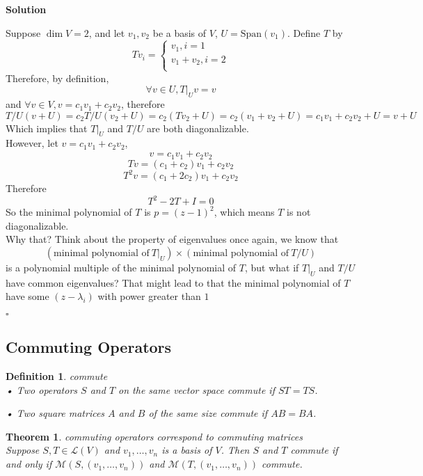 \documentclass{article}
\newtheorem{theorem}{Theorem}[subsection]
\newtheorem{definition}{Definition}[subsection]
\newenvironment{solution}{%
{
    \textbf{Solution\\}
    }
}{
  \hfill $\square$ 
  \par\bigskip 
}
\newcommand{\spans}{\text{Span}}
\begin{document}
\begin{CJK}{UTF8}{gkai}
\begin{solution}
    Suppose $\dim V = 2$, and let $v_1,v_2$ be a basis of $V$, $U = \spans(v_1)$. Define $T$ by 
    \[Tv_i = \begin{cases}
        v_1,i = 1\\
        v_1 + v_2, i = 2\\
    \end{cases}\]
    Therefore, by definition,
    \[\forall v \in U, T|_U v = v \]
    and $\forall v \in V, v = c_1 v_1 + c_2 v_2$, therefore 
    \[T/U (v + U) = c_2 T/U (v_2 + U) = c_2 (Tv_2 + U) = c_2 (v_1 + v_2 + U) = c_1 v_1 + c_2 v_2 + U = v + U\]
    Which implies that $T|_U$ and $T/U$ are both diagonalizable.\\

    However, let $v = c_1 v_1 + c_2 v_2$,
    \[v = c_1 v_1 + c_2 v_2\]
    \[Tv = (c_1 + c_2) v_1 + c_2 v_2\]
    \[T^2 v = (c_1 + 2c_2) v_1 + c_2 v_2\]
    Therefore
    \[T^2 - 2T + I = 0\]
    So the minimal polynomial of $T$ is $p = (z - 1)^2$, which means $T$ is not diagonalizable.\\

    Why that? Think about the property of eigenvalues once again, we know that
    \[(\text{minimal polynomial of}~ T|_U) \times (\text{minimal polynomial of}~ T/U)\]
    is a polynomial multiple of the minimal polynomial of $T$, but what if $T|_U$ and $T/U$ have common eigenvalues? That might lead to that the minimal polynomial of $T$ have some $(z - \lambda_i)$ with power greater than $1$
\end{solution}

\subsection{Commuting Operators}
\begin{definition}
    commute\\

    • Two operators $S$ and $T$ on the same vector space commute if $ST = TS$.

    • Two square matrices $A$ and $B$ of the same size commute if $AB = BA$.
\end{definition}

\begin{theorem}
    commuting operators correspond to commuting matrices\\

    Suppose $S,T \in \mathcal{L}(V)$ and $v_1,\ldots,v_n$ is a basis of $V$. Then $S$ and $ T$ commute if and only if $\mathcal{M}(S,(v_1,\ldots,v_n))$ and $\mathcal{M}(T,(v_1,\ldots,v_n))$ commute.


\end{theorem}
\end{CJK}
\end{document}
